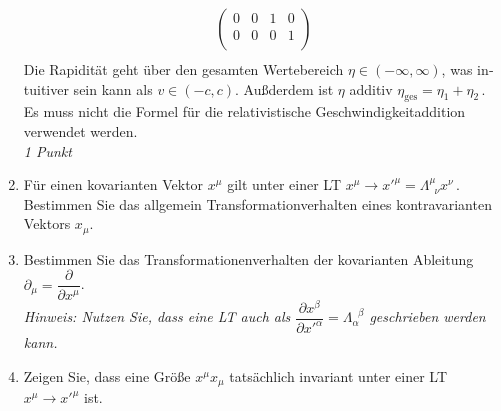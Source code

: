 \documentclass{exercise}
\begin{document}
\begin{enumerate}
{\begin{align*}
\begin{pmatrix}
                0 & 0 & 1 & 0 \\
                0 & 0 & 0 & 1 \\
            \end{pmatrix} \\
        \end{align*}
        Die Rapidität geht über den gesamten Wertebereich $\eta \in \left(-\infty, \infty\right)$, was in­tu­i­tiver sein kann als $v \in \left(-c, c\right)$.
        Außderdem ist $\eta$ additiv $\eta_\text{ges} = \eta_1 + \eta_2$\,.
        Es muss nicht die Formel für die relativistische Geschwindigkeitaddition verwendet werden.\\
        \textit{1 Punkt}
        }
        \item Für einen kovarianten Vektor $x^{\mu}$ gilt unter einer LT $x^{\mu} \rightarrow x'^{\mu} = \Lambda_{\phantom{\nu} \nu}^\mu x^{\nu}\,.$
        Bestimmen Sie das allgemein Transformationverhalten eines kontravarianten Vektors $x_{\mu}$.
        \item Bestimmen Sie das Transformationenverhalten der kovarianten Ableitung $\partial_\mu = \dfrac{\partial}{\partial x^\mu}$.\\
        \textit{Hinweis: Nutzen Sie, dass eine LT auch als $\dfrac{\partial x^\beta}{\partial x'^\alpha} = \Lambda^{\phantom{\beta} \beta}_\alpha$ geschrieben werden kann.}
        \item Zeigen Sie, dass eine Größe $x^\mu x_\mu$ tatsächlich invariant unter einer LT $x^\mu \rightarrow x'^\mu$ ist.

\end{enumerate}
\end{document}
